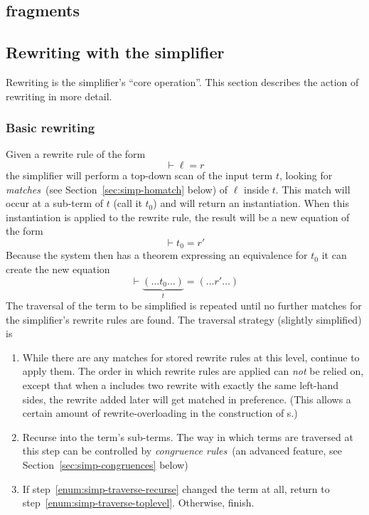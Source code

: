 \subsection{\Simpset{} fragments}
\label{sec:simpset-fragments}

\subsection{Rewriting with the simplifier}
\label{sec:simplifier-rewriting}

Rewriting is the simplifier's ``core operation''.  This section
describes the action of rewriting in more detail.


\subsubsection{Basic rewriting}
\label{sec:basic-rewriting}

Given a rewrite rule of the form \[
\vdash \ell = r
\]
the simplifier will perform a top-down scan of the input term $t$,
looking for \emph{matches}~(see Section~\ref{sec:simp-homatch} below)
of $\ell$ inside $t$.  This match will occur at a sub-term of $t$
(call it $t_0$) and will return an instantiation.  When this
instantiation is applied to the rewrite rule, the result will be a new
equation of the form \[
\vdash t_0 = r'
\]
Because the system then has a theorem expressing an equivalence for
$t_0$ it can create the new equation \[
  \vdash \underbrace{(\dots t_0\dots)}_t = (\dots r' \dots)
\]
The traversal of the term to be simplified is repeated until no
further matches for the simplifier's rewrite rules are found.  The
traversal strategy (slightly simplified) is
\begin{enumerate}
\item \label{enum:simp-traverse-toplevel}%
  While there are any matches for stored rewrite rules at this level,
  continue to apply them.  The order in which rewrite rules are
  applied can \emph{not} be relied on, except that when a \simpset{}
  includes two rewrite with exactly the same left-hand sides, the
  rewrite added later will get matched in preference.  (This allows a
  certain amount of rewrite-overloading in the construction of
  \simpset{}s.)
\item \label{enum:simp-traverse-recurse}%
  Recurse into the term's sub-terms.  The way in which terms are
  traversed at this step can be controlled by \emph{congruence
    rules}~(an advanced feature, see Section~\ref{sec:simp-congruences}
  below)
\item If step~\ref{enum:simp-traverse-recurse} changed the term at
  all, return to step~\ref{enum:simp-traverse-toplevel}.  Otherwise,
  finish.
\end{enumerate}

